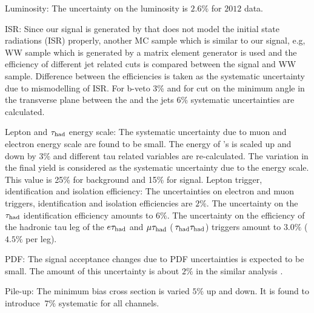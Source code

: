  Luminosity: The uncertainty on the luminosity  is $2.6\%$ for $2012$ data.

 ISR: Since our signal is generated by \PYTHIA that does not  model the initial state radiations (ISR) properly, another MC sample which is similar to our signal, e.g, WW sample 
which is generated by a matrix element generator is used and the efficiency of different jet related cuts is compared between the signal and WW sample. Difference between the
efficiencies is taken as the systematic uncertainty due to mismodelling of ISR. For b-veto 3\% and for cut on   the minimum angle in the transverse plane between 
the \MET and the jets 6\% systematic uncertainties are  calculated.  

 Lepton and $\tau_{\rm had}$ energy scale: The systematic uncertainty due to muon and electron energy scale are found to be small.
The energy of \hadtau's is scaled up and down by $3\%$ and different tau related variables are re-calculated.  The variation in the final yield is considered as the
systematic uncertainty due to the \Tau energy scale. This value is 25\% for background and 15\% for signal.
 Lepton trigger, identification and isolation efficiency: The uncertainties on electron and muon triggers, identification and isolation efficiencies are $2\%$. 
The uncertainty on the $\tau_{\rm had}$ identification efficiency amounts to $6\%$. 
The uncertainty on the efficiency of the hadronic tau leg of the $e\tau_{\rm had}$ and $\mu\tau_{\rm had}$ ($\,\tau_{\rm had}\tau_{\rm had}$) triggers amount to $3.0\%$ ($4.5\%$ per leg).

 PDF: The signal acceptance changes due to PDF uncertainties is expected to be small. 
The amount of this uncertainty is about $2\%$ in the similar analysis \cite{Khachatryan:2014qwa}.

 Pile-up: The minimum bias cross section is varied $5 \%$ up and down. It is found to introduce $~7 \%$ systematic for all channels.    



